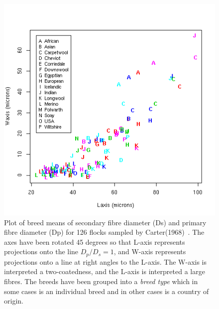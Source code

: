 %

\begin{figure}[!h]
  \centering
   \includegraphics[width=1.0\textwidth]{LWalltype.png}
  \caption{Plot of breed means of secondary fibre diameter (Ds) and primary fibre diameter (Dp) for 126 flocks sampled by Carter(1968)~\cite{cart:68}. The axes have been rotated 45 degrees so that L-axis represents projections onto the line $D_{p}/D_{s} = 1$, and W-axis represents projections onto a line at right angles to the L-axis. The W-axis is interpreted a two-coatedness, and the L-axis is interpreted a large fibres. The breeds have been grouped into a {\em breed type} which in some cases is an individual breed and in other cases is a country of origin. }
  \label{fig:LWalltype}
\end{figure}

%

